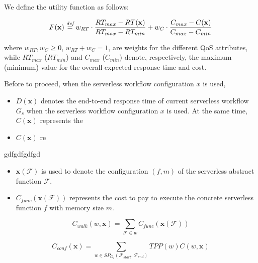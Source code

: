 We define the utility function as follows:

\begin{equation}
	F(\textbf{x}) \overset{\textit{def}}{=} w_{RT} \cdot \dfrac{RT_{max} - RT(\textbf{x})}{RT_{max} - RT_{min}} + w_{C} \cdot \dfrac{C_{max} - C(\textbf{x})}{C_{max} - C_{min}}
\end{equation}

where $w_{RT}, w_{C} \geq 0$, $w_{RT} + w_{C} = 1$, are weights for the different QoS attributes, while $RT_{max}$ ($RT_{min}$) and $C_{max}$ ($C_{min}$) denote, respectively, the maximum (minimum) value for the overall expected response time and cost.






Before to proceed, when the serverless workflow configuration $x$ is used,




\begin{itemize}
	\item $D(\textbf{x})$ denotes the end-to-end response time of current serverless workflow $G_s$ when the serverless workflow configuration $x$ is used. At the same time, $C(\textbf{x})$ represents the  
	\item $C(\textbf{x})$ re
\end{itemize}

gdfgdfgdfgd

\begin{itemize}
	\item $\textbf{x}(\mathscr{F})$ is used to denote the configuration $\left( f, m \right) $ of the serverless abstract function $\mathscr{F}$.
	\item $C_{func}(\textbf{x}(\mathscr{F}))$ represents the cost to pay to execute the concrete serverless function $f$ with memory size $m$.
\end{itemize}



\begin{equation}
	C_{walk}(w, \textbf{x}) = \sum_{\mathscr{F} \in w} C_{func}(\textbf{x}(\mathscr{F}))
\end{equation}


\begin{equation}
	C_{conf}(\textbf{x}) = \sum_{w \in SP_{G_s}(\mathscr{F}_{start}, \mathscr{F}_{end})} TPP(w) C(w, \textbf{x})
\end{equation}


